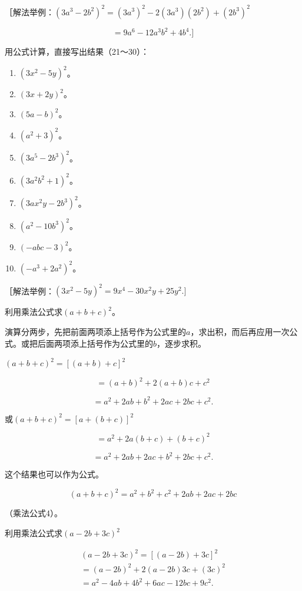 ［解法举例：\((3a^{3} - 2b^{2})^{2} = (3a^{3})^{2} - 2(3a^{3})(2b^{2}) + (2b^{3})^{2}\)

\[
= 9 a ^{6} - 12 a ^{3} b ^{2} + 4 b ^{4}. ]
\]

用公式计算，直接写出结果（21～30）：

\begin{enumerate}[start=21]
\item
  \((3x^{2} - 5y)^{2}\)。
\item
  \((3x + 2y)^{2}\)。
\item
  \((5a - b)^2\)。
\item
  \((a^2 + 3)^2\)。
\item
  \((3a^{5} - 2b^{3})^{2}\)。
\item
  \((3a^{2}b^{2} + 1)^{2}\)。
\item
  \((3ax^{2}y - 2b^{3})^{2}\)。
\item
  \((a^{2} - 10b^{3})^{2}\)。
\item
  \((-abc - 3)^{2}\)。
\item
  \((-a^{3} + 2a^{2})^{2}\)。
\end{enumerate}

［解法举例：\((3x^{2} - 5y)^{2} = 9x^{4} - 30x^{2}y + 25y^{2}.]\)

 利用乘法公式求\((a + b + c)^2\)。

演算分两步，先把前面两项添上括号作为公式里的\(a\)，求出积，而后再应用一次公式。或把后面两项添上括号作为公式里的\(b\)，逐步求积。

\((a + b + c)^2 = [(a + b) + c]^2\)

\[
= (a + b) ^{2} + 2 (a + b) c + c ^{2}
\]

\[
= a ^{2} + 2 a b + b ^{2} + 2 a c + 2 b c + c ^{2}.
\]

或\((a + b + c)^2 = [a + (b + c)]^2\)

\[
= a ^{2} + 2 a (b + c) + (b + c) ^{2}
\]

\[
= a ^{2} + 2 a b + 2 a c + b ^{2} + 2 b c + c ^{2}.
\]

这个结果也可以作为公式。

\[
(a + b + c) ^{2} = a ^{2} + b ^{2} + c ^{2} + 2 a b + 2 a c + 2 b c
\]

（乘法公式4）。

 利用乘法公式求\((a - 2b + 3c)^2\)


\[
\begin{array}{l} (a - 2 b + 3 c) ^{2} = [ (a - 2 b) + 3 c ] ^{2} \\ = (a - 2 b) ^{2} + 2 (a - 2 b) 3 c + (3 c) ^{2} \\ = a ^{2} - 4 a b + 4 b ^{2} + 6 a c - 12 b c + 9 c ^{2}. \\ \end{array}
\]

